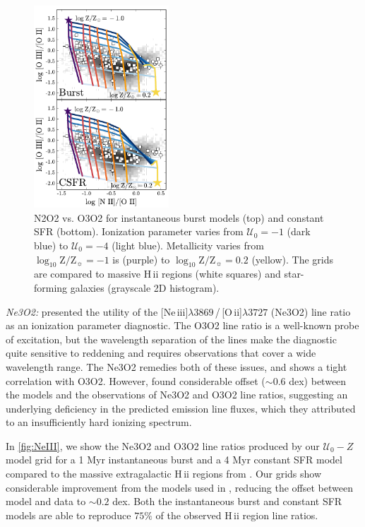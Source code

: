 \documentclass[linenumbers, trackchanges, tighten]{aastex61}%
\newcommand{\Fig}[1]{\autoref{fig:#1}}
\newcommand{\logten}{\ensuremath{\log_{10}}}
\newcommand{\oii}{[O\,{\sc ii}]\xspace}
\newcommand{\neiii}{[Ne\,{\sc iii}]\xspace}
\newcommand{\hii}{H\,{\sc ii}\xspace}
\newcommand\lam[1]{\ensuremath{\lambda #1}}
\newcommand{\logZeq}[1]{\ensuremath{\logten \mathrm{Z}/\mathrm{Z}_{\sun} = #1}}
\newcommand{\U}{\ensuremath{\mathcal{U}_{0}}}
\begin{document}
\begin{figure}[!htbp]
  \begin{centering}
    \includegraphics[width=0.45\textwidth]{f19.pdf}
    \caption{N2O2 vs. O3O2 for instantaneous burst models (top) and constant SFR (bottom). Ionization parameter varies from $\U=-1$ (dark blue) to $\U=-4$ (light blue). Metallicity varies from \logZeq{-1} is (purple) to \logZeq{0.2} (yellow). The grids are compared to massive \hii regions (white squares) and star-forming galaxies (grayscale 2D histogram).}
    \label{fig:NIIOII}
  \end{centering}
\end{figure}

{\it Ne3O2:} \citet{Levesque14} presented the utility of the \neiii\lam{3869}\,/\,\oii\lam{3727} (Ne3O2) line ratio as an ionization parameter diagnostic. The O3O2 line ratio is a well-known probe of excitation, but the wavelength separation of the lines make the diagnostic quite sensitive to reddening and requires observations that cover a wide wavelength range. The Ne3O2 remedies both of these issues, and shows a tight correlation with O3O2. However, \citet{Levesque14} found considerable offset (${\sim}0.6$ dex) between the models and the observations of Ne3O2 and O3O2 line ratios, suggesting an underlying deficiency in the predicted emission line fluxes, which they attributed to an insufficiently hard ionizing spectrum. 

In \Fig{NeIII}, we show the Ne3O2 and O3O2 line ratios produced by our $\U-Z$ model grid for a 1 Myr instantaneous burst and a 4 Myr constant SFR model compared to the massive extragalactic \hii regions from \citet{vanzee98}. Our grids show considerable improvement from the models used in \citet{Levesque14}, reducing the offset between model and data to $\sim 0.2$ dex. Both the instantaneous burst and constant SFR models are able to reproduce $75\%$ of the observed \hii region line ratios.
\end{document}
